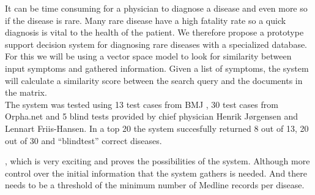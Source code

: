 
It can be time consuming for a physician to diagnose a disease and
even more so if the disease is rare. Many rare disease have a high
fatality rate so a quick diagnosis is vital to the health of the
patient. We therefore propose a prototype support decision system for
diagnosing rare diseases with a specialized database. For this we will
be using a vector space model to look for similarity between input
symptoms and gathered information. Given a list of symptoms, the
system will calculate a similarity score between the search query and
the documents in the matrix. \\

The system was tested using 13 test cases from
BMJ \cite{HangwiTang11102006}, 30 test cases from Orpha.net and 5 
blind tests provided by chief physician Henrik J\o rgensen and Lennart Friis-Hansen. 
In a top 20 the system succesfully returned 8 out of 13, 20 out of 30 
and ``blindtest'' correct diseases.

, which is very exciting and proves the
possibilities of the system. Although more control over the initial
information that the system gathers is needed. And there needs to be a
threshold of the minimum number of Medline records per disease.\\
